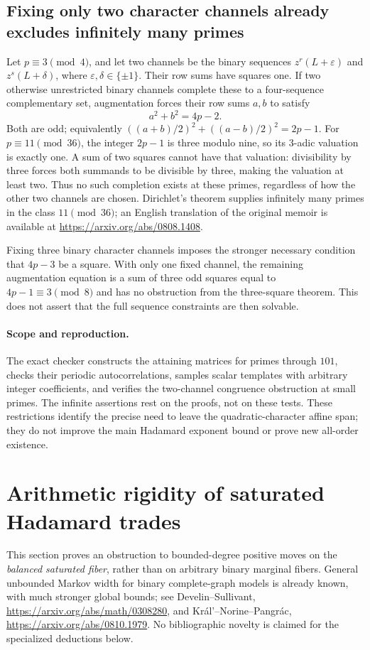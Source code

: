 \documentclass[11pt]{article}
\begin{document}
\subsection{Fixing only two character channels already excludes infinitely many primes}
Let $p\equiv3\pmod4$, and let two channels be the binary sequences
$z^r(L+\varepsilon)$ and $z^s(L+\delta)$, where
$\varepsilon,\delta\in\{\pm1\}$. Their row sums have squares one.
If two otherwise unrestricted binary channels complete these to a
four-sequence complementary set, augmentation forces their row sums
$a,b$ to satisfy
\[
 a^2+b^2=4p-2.
\]
Both are odd; equivalently
$((a+b)/2)^2+((a-b)/2)^2=2p-1$.
For $p\equiv11\pmod{36}$, the integer $2p-1$ is three modulo nine,
so its $3$-adic valuation is exactly one. A sum of two squares cannot
have that valuation: divisibility by three forces both summands to
be divisible by three, making the valuation at least two. Thus no
such completion exists at these primes, regardless of how the other
two channels are chosen. Dirichlet's theorem supplies infinitely many
primes in the class $11\pmod{36}$; an English translation of the
original memoir is available at \url{https://arxiv.org/abs/0808.1408}.

Fixing three binary character channels imposes the stronger necessary
condition that $4p-3$ be a square. With only one fixed channel, the
remaining augmentation equation is a sum of three odd squares equal
to $4p-1\equiv3\pmod8$ and has no obstruction from the three-square
theorem. This does not assert that the full sequence constraints are
then solvable.

\paragraph{Scope and reproduction.}
The exact checker constructs the attaining matrices for primes through
$101$, checks their periodic autocorrelations, samples scalar templates
with arbitrary integer coefficients, and verifies the two-channel
congruence obstruction at small primes. The infinite assertions rest
on the proofs, not on these tests. These restrictions identify the
precise need to leave the quadratic-character affine span; they do not
improve the main Hadamard exponent bound or prove new all-order existence.

\section{Arithmetic rigidity of saturated Hadamard trades}
This section proves an obstruction to bounded-degree positive moves on the
\emph{balanced saturated fiber}, rather than on arbitrary binary marginal
fibers. General unbounded Markov width for binary complete-graph models is
already known, with much stronger global bounds; see Develin--Sullivant,
\url{https://arxiv.org/abs/math/0308280}, and
Kr\'al'--Norine--Pangr\'ac,
\url{https://arxiv.org/abs/0810.1979}. No bibliographic novelty is claimed
for the specialized deductions below.
\end{document}
